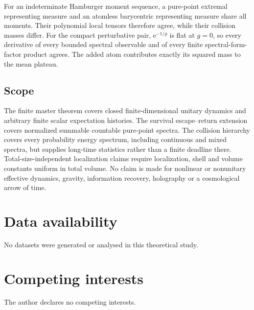 \documentclass[10pt]{article}
\theoremstyle{definition}
\newcommand{\ee}{\mathrm e}
\begin{document}
For an indeterminate Hamburger moment sequence, a pure-point extremal
representing measure and an atomless barycentric representing measure share
all moments. Their polynomial local tensors therefore agree, while their
collision masses differ. For the compact perturbative pair,
\(\ee^{-1/g}\) is flat at \(g=0\), so every derivative of every bounded
spectral observable and of every finite spectral-form-factor product
agrees. The added atom contributes exactly its squared mass to the mean
plateau.

\subsection*{Scope}

The finite master theorem covers closed finite-dimensional unitary
dynamics and arbitrary finite scalar expectation histories. The survival
escape--return extension covers normalized summable countable pure-point
spectra. The collision hierarchy covers every probability energy spectrum,
including continuous and mixed spectra, but supplies long-time statistics
rather than a finite deadline there. Total-size-independent localization
claims require localization, shell and volume constants uniform in total
volume. No claim is made for nonlinear or nonunitary effective dynamics,
gravity, information recovery, holography or a cosmological arrow of time.

\section*{Data availability}

No datasets were generated or analysed in this theoretical study.

\section*{Competing interests}

The author declares no competing interests.
\end{document}
